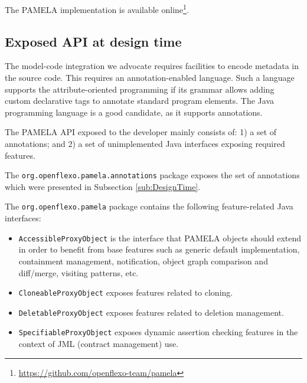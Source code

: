 The PAMELA implementation is available online\footnote {\url{https://github.com/openflexo-team/pamela}}.

\subsection{Exposed API at design time}

The model-code integration we advocate requires facilities to encode metadata in the source code. This requires an annotation-enabled language. Such a language supports the attribute-oriented programming if its grammar allows adding custom declarative tags to annotate standard program elements. The Java programming language is a good candidate, as it supports annotations.

The PAMELA API exposed to the developer mainly consists of: 1) a set of annotations; and 2) a set of unimplemented Java interfaces exposing required features.

The \texttt{org.openflexo.pamela.annotations} package exposes the set of annotations which were presented in Subsection \ref{sub:DesignTime}.

The \texttt{org.openflexo.pamela} package contains the following feature-related Java interfaces:
\begin{itemize}
    \item \texttt{AccessibleProxyObject} is the interface that PAMELA objects should extend in order to benefit from base features such as generic default implementation, containment management, notification, object graph comparison and diff/merge, visiting patterns, etc.
    \item \texttt{CloneableProxyObject} exposes features related to cloning.
    \item \texttt{DeletableProxyObject} exposes features related to deletion management.
    \item \texttt{SpecifiableProxyObject} exposes dynamic assertion checking features in the context of JML (contract management) use. 
\end{itemize}


